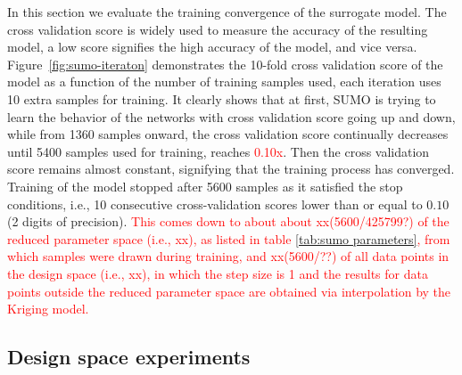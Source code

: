 In this section we evaluate the training convergence of
the surrogate model. The cross validation score is widely used to measure the accuracy of the resulting model, a low score signifies the high accuracy of the model, and vice versa. Figure~\ref{fig:sumo-iteraton} demonstrates the 10-fold cross validation score of the model as a function of the number of training samples used, each iteration uses 10 extra samples for training.  %
It clearly shows that at first, SUMO is trying to learn the behavior of the networks with cross validation score going up and down, while from 1360 samples onward, the cross validation score continually decreases until 5400 samples used for training, reaches \textcolor{red}{0.10x}. Then the cross validation score remains almost constant, signifying that the training process has converged.  Training of the model stopped after 5600 samples as it satisfied the stop conditions, i.e., 10 consecutive cross-validation scores lower than or equal to $0.10$ (2 digits of precision). \textcolor{red}{This comes down to about 
about xx(5600/425799?) of the reduced parameter space (i.e., xx), as listed in table \ref{tab:sumo parameters}, from which samples were drawn during training, and xx(5600/??) of all data points in the design space (i.e., xx), in which the step size is \textcolor{red}{1} and the results for data points outside the reduced parameter space are obtained via interpolation by the Kriging  model.}





\subsection{Design space experiments}


